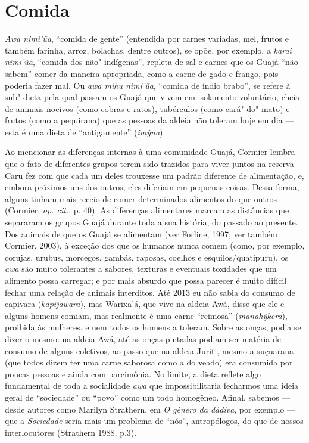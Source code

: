 \section{Comida}\label{comida}

\emph{Awa nimi'ũa}, ``comida de gente'' (entendida por carnes variadas,
mel, frutos e também farinha, arroz, bolachas, dentre outros), se opõe,
por exemplo, a \emph{karai nimi'ũa}, ``comida dos não"-indígenas'', repleta
de sal e carnes que os Guajá ``não sabem'' comer da maneira apropriada,
como a carne de gado e frango, pois poderia fazer mal. Ou \emph{awa mihu
nimi'ũa}, ``comida de índio brabo'', se refere à sub"-dieta pela qual
passam os Guajá que vivem em isolamento voluntário, cheia de animais
nocivos (como cobras e ratos), tubérculos (como cará"-do"-mato) e frutos
(como a pequirana) que as pessoas da aldeia não toleram hoje em dia ---
esta é uma dieta de ``antigamente'' (\emph{imỹna}).

Ao mencionar as diferenças internas à uma comunidade Guajá, Cormier
lembra que o fato de diferentes grupos terem sido trazidos para viver
juntos na reserva Caru fez com que cada um deles trouxesse um padrão
diferente de alimentação, e, embora próximos uns dos outros, eles
diferiam em pequenas coisas. Dessa forma, alguns tinham mais receio de
comer determinados alimentos do que outros (Cormier, \emph{op. cit.}, p. 40).
As diferenças alimentares marcam as distâncias que separaram os grupos
Guajá durante toda a sua história, do passado ao presente. Dos animais
de que os Guajá se alimentam (ver Forline, 1997; ver também Cormier,
2003), à exceção dos que os humanos nunca comem (como, por exemplo,
corujas, urubus, morcegos, gambás, raposas, coelhos e
esquilos/quatipuru), os \emph{awa} são muito tolerantes a sabores,
texturas e eventuais toxidades que um alimento possa carregar; e por
mais absurdo que possa parecer é muito difícil fechar uma relação de
animais interditos. Até 2013 eu não sabia do consumo de capivara
(\emph{kapijawara}), mas Warixa'á, que vive na aldeia Awá, disse que ele
e alguns homens comiam, mas realmente é uma carne ``reimosa''
(\emph{manahỹkera}), proibida às mulheres, e nem todos os homens a
toleram. Sobre as onças, podia se dizer o mesmo: na aldeia Awá, até as
onças pintadas podiam ser matéria de consumo de alguns coletivos, ao
passo que na aldeia Juriti, mesmo a suçuarana (que todos dizem ter uma
carne saborosa como a do veado) era consumida por poucas pessoas e ainda
com parcimônia. No limite, a dieta reflete algo fundamental de toda a
socialidade \emph{awa} que impossibilitaria fecharmos uma ideia geral de
``sociedade'' ou ``povo'' como um todo homogêneo. Afinal, sabemos ---
desde autores como Marilyn Strathern, em \emph{O gênero da dádiva}, por
exemplo --- que a \emph{Sociedade} seria mais um problema de ``nós'',
antropólogos, do que de nossos interlocutores (Strathern 1988, p.3).

